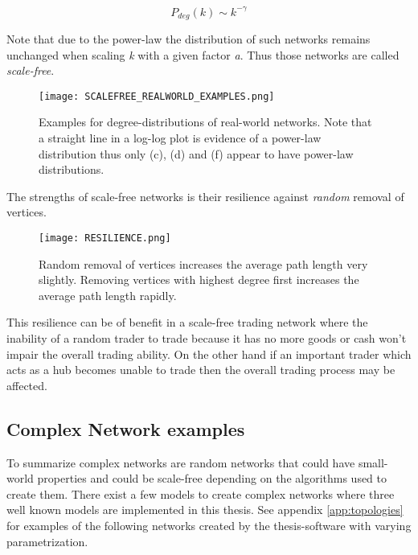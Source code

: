\documentclass[../Bachelorarbeit.tex]{subfiles}
\begin{document}
\begin{equation}
P_{deg}(k) \sim k^{-\gamma}
\end{equation}

Note that due to the power-law the distribution of such networks remains unchanged when scaling \textit{k} with a given factor \textit{a}. Thus those networks are called \textit{scale-free}.

\begin{figure}[H]
	\centering
  \texttt{[image: SCALEFREE\_REALWORLD\_EXAMPLES.png]}
  	\caption{Examples for degree-distributions of real-world networks. Note that a straight line in a log-log plot is evidence of a power-law distribution thus only (c), (d) and (f) appear to have power-law distributions. \cite{Newman_ComplexNetworks} }
	\label{fig:SCALEFREE_REALWORLD_EXAMPLES}
\end{figure}

\medskip

The strengths of scale-free networks is their resilience against \textit{random} removal of vertices.

\begin{figure}[H]
	\centering
  \texttt{[image: RESILIENCE.png]}
  	\caption{Random removal of vertices increases the average path length very slightly. Removing vertices with highest degree first increases the average path length rapidly. \cite{Newman_ComplexNetworks} }
	\label{fig:RESILIENCE}
\end{figure}

This resilience can be of benefit in a scale-free trading network where the inability of a random trader to trade because it has no more goods or cash won't impair the overall trading ability. On the other hand if an important trader which acts as a hub becomes unable to trade then the overall trading process may be affected.

\subsection{Complex Network examples}
To summarize complex networks are random networks that could have small-world properties and could be scale-free depending on the algorithms used to create them. There exist a few models to create complex networks where three well known models are implemented in this thesis. See appendix \ref{app:topologies} for examples of the following networks created by the thesis-software with varying parametrization.
\end{document}
